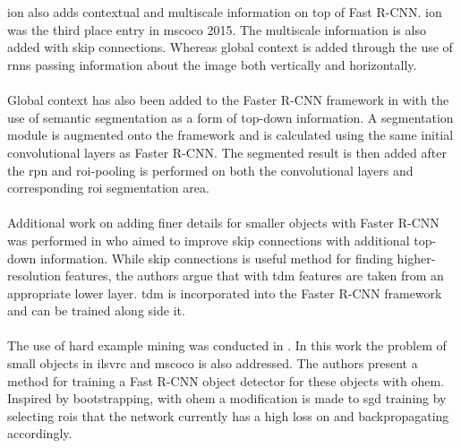 \\\\
\gls{ion} \cite{ion} also adds contextual and multiscale information on top of Fast R-CNN. \gls{ion} was the third place entry in \gls{mscoco} 2015. The multiscale information is also added with skip connections. Whereas global context is added through the use of \glspl{rnn} passing information about the image both vertically and horizontally.
\\\\
Global context has also been added to the Faster R-CNN framework in \cite{contextprim} with the use of semantic segmentation as a form of top-down information. A segmentation module is augmented onto the framework and is calculated using the same initial convolutional layers as Faster R-CNN. The segmented result is then added after the \gls{rpn} and \gls{roi}-pooling is performed on both the convolutional layers and corresponding \gls{roi} segmentation area.
\\\\
Additional work on adding finer details for smaller objects with Faster R-CNN was performed in \cite{beyondskip} who aimed to improve skip connections with additional top-down information. While skip connections is useful method for finding higher-resolution features, the authors argue that with \gls{tdm} features are taken from an appropriate lower layer. \gls{tdm} is incorporated into the Faster R-CNN framework and can be trained along side it. 
\\\\
The use of hard example mining was conducted in \cite{ohem}. In this work the problem of small objects in \gls{ilsvrc} and \gls{mscoco} is also addressed. The authors present a method for training a Fast R-CNN object detector for these objects with \gls{ohem}. Inspired by bootstrapping, with \gls{ohem} a modification is made to \gls{sgd} training by selecting \glspl{roi} that the network currently has a high loss on and backpropagating accordingly. 
\\\\
